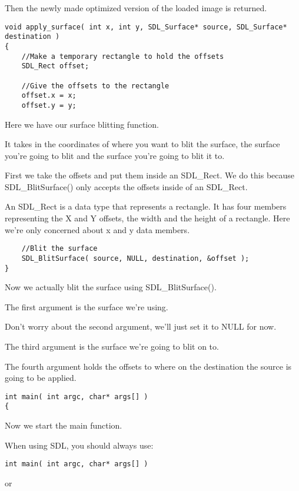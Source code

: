 Then the newly made optimized version of the loaded image is returned.

\begin{verbatim}
void apply_surface( int x, int y, SDL_Surface* source, SDL_Surface* destination )
{
    //Make a temporary rectangle to hold the offsets
    SDL_Rect offset;

    //Give the offsets to the rectangle
    offset.x = x;
    offset.y = y;
\end{verbatim}

Here we have our surface blitting function.

It takes in the coordinates of where you want to blit the surface, the surface
you're going to blit and the surface you're going to blit it to.

First we take the offsets and put them inside an SDL\_Rect. We do this because
SDL\_BlitSurface() only accepts the offsets inside of an SDL\_Rect.

An SDL\_Rect is a data type that represents a rectangle. It has four members
representing the X and Y offsets, the width and the height of a rectangle. Here
we're only concerned about x and y data members.

\begin{verbatim}
    //Blit the surface
    SDL_BlitSurface( source, NULL, destination, &offset );
}
\end{verbatim}

Now we actually blit the surface using SDL\_BlitSurface().

The first argument is the surface we're using.

Don't worry about the second argument, we'll just set it to NULL for now.

The third argument is the surface we're going to blit on to.

The fourth argument holds the offsets to where on the destination the source is
going to be applied.

\begin{verbatim}
int main( int argc, char* args[] )
{
\end{verbatim}

Now we start the main function.

When using SDL, you should always use:

\begin{verbatim}
int main( int argc, char* args[] )
\end{verbatim}

or

